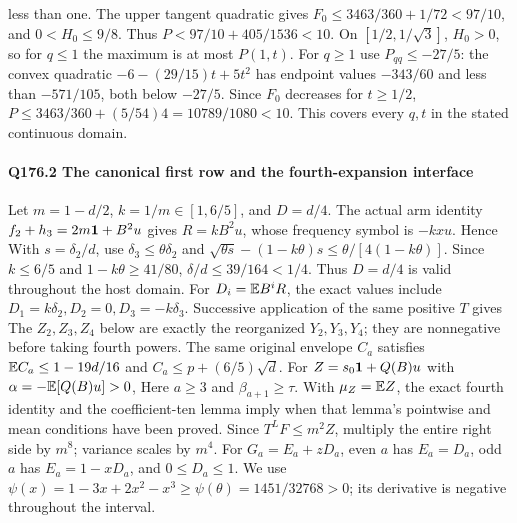less than one. The upper tangent quadratic gives
$F_0\le\allowbreak 3463/360+1/72<\allowbreak 97/10$, and $0<\allowbreak H_0\le\allowbreak 9/8$.
Thus $P<\allowbreak 97/10+405/1536<\allowbreak 10$.
On $[1/2,\allowbreak 1/\sqrt3]$, $H_0>\allowbreak 0$, so for $q\le\allowbreak 1$ the maximum is at most
$P(1,\allowbreak t)$. For $q\ge\allowbreak 1$ use $P_{qq}\le\allowbreak -27/5$:
the convex quadratic $-6-(29/15)t+5t^2$ has endpoint values
$-343/60$ and less than $-571/105$, both below $-27/5$.
Since $F_0$ decreases for $t\ge\allowbreak 1/2$,
$P\le\allowbreak 3463/360+(5/54)4=\allowbreak 10789/1080<\allowbreak 10$.
This covers every $q,\allowbreak t$ in the stated continuous domain.

\paragraph{Q176.2 The canonical first row and the fourth-expansion interface}\label{part:Q176.2}
Let $m=\allowbreak 1-d/2$, $k=\allowbreak 1/m\in[1,\allowbreak 6/5]$, and $D=\allowbreak d/4$.
The actual arm identity $f_2+h_3=\allowbreak 2m\mathbf1+B^2u$ gives
$R=\allowbreak kB^2u$, whose frequency symbol is $-kxu$. Hence
With $s=\allowbreak \delta_2/d$, use $\delta_3\le\allowbreak \theta\delta_2$ and
$\sqrt{\theta s}-(1-k\theta)s\le\allowbreak \theta/[4(1-k\theta)]$.
Since $k\le\allowbreak 6/5$ and $1-k\theta\ge\allowbreak 41/80$,
$\delta/d\le\allowbreak 39/164<\allowbreak 1/4$.
Thus $D=\allowbreak d/4$ is valid throughout the host domain.
For $D_i=\allowbreak \mathbb E B^iR$, the exact values include
$D_1=\allowbreak k\delta_2,\allowbreak D_2=\allowbreak 0,\allowbreak D_3=\allowbreak -k\delta_3$.
Successive application of the same positive $T$ gives
The $Z_2,\allowbreak Z_3,\allowbreak Z_4$ below are exactly the reorganized $Y_2,\allowbreak Y_3,\allowbreak Y_4$;
they are nonnegative before taking fourth powers.
The same original envelope $C_a$ satisfies
$\mathbb E C_a\le\allowbreak 1-19d/16$ and $C_a\le\allowbreak  p+(6/5)\sqrt d$.
For $Z=\allowbreak s_0\mathbf1+Q(B)u$ with $\alpha=\allowbreak -\mathbb E[Q(B)u]>\allowbreak 0$,
Here $a\ge\allowbreak 3$ and $\beta_{a+1}\ge\allowbreak \tau$.
With $\mu_Z=\allowbreak \mathbb E Z$, the exact fourth identity and the coefficient-ten
lemma imply
when that lemma's pointwise and mean conditions have been proved.
Since $T^LF\le\allowbreak  m^2Z$, multiply the entire right side by $m^8$;
variance scales by $m^4$.
For $G_a=\allowbreak E_a+zD_a$, even $a$ has $E_a=\allowbreak D_a$, odd $a$ has
$E_a=\allowbreak 1-xD_a$, and $0\le\allowbreak  D_a\le\allowbreak 1$.
We use
$\psi(x)=\allowbreak 1-3x+2x^2-x^3\ge\allowbreak \psi(\theta)=\allowbreak 1451/32768>\allowbreak 0$;
its derivative is negative throughout the interval.

